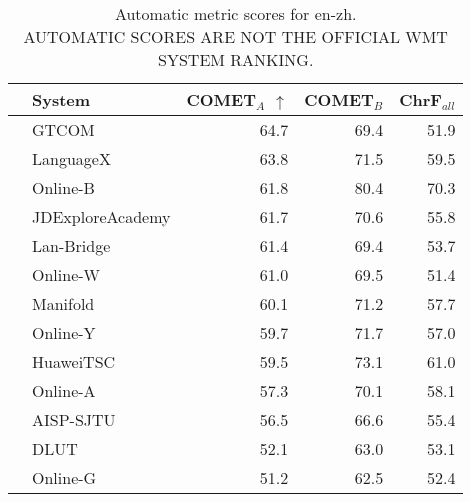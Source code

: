 \begin{table}
\centering
\caption{Automatic metric scores for en-zh. \\AUTOMATIC SCORES ARE NOT THE OFFICIAL WMT SYSTEM RANKING.}
\begin{tabular}{llrrr}
\toprule
          &            System &  COMET$_{A}$ $\uparrow$ &  COMET$_{B}$ &  ChrF$_{all}$ \\
\midrule
 \Uncon{} &             GTCOM &                    64.7 &         69.4 &          51.9 \\
 \Uncon{} &         LanguageX &                    63.8 &         71.5 &          59.5 \\
 \Uncon{} &          Online-B &                    61.8 &         80.4 &          70.3 \\
 \Const{} &  JDExploreAcademy &                    61.7 &         70.6 &          55.8 \\
 \Uncon{} &        Lan-Bridge &                    61.4 &         69.4 &          53.7 \\
 \Uncon{} &          Online-W &                    61.0 &         69.5 &          51.4 \\
 \Const{} &          Manifold &                    60.1 &         71.2 &          57.7 \\
 \Uncon{} &          Online-Y &                    59.7 &         71.7 &          57.0 \\
 \Uncon{} &         HuaweiTSC &                    59.5 &         73.1 &          61.0 \\
 \Uncon{} &          Online-A &                    57.3 &         70.1 &          58.1 \\
 \Const{} &         AISP-SJTU &                    56.5 &         66.6 &          55.4 \\
 \Const{} &              DLUT &                    52.1 &         63.0 &          53.1 \\
 \Uncon{} &          Online-G &                    51.2 &         62.5 &          52.4 \\
\bottomrule
\end{tabular}
\end{table}



